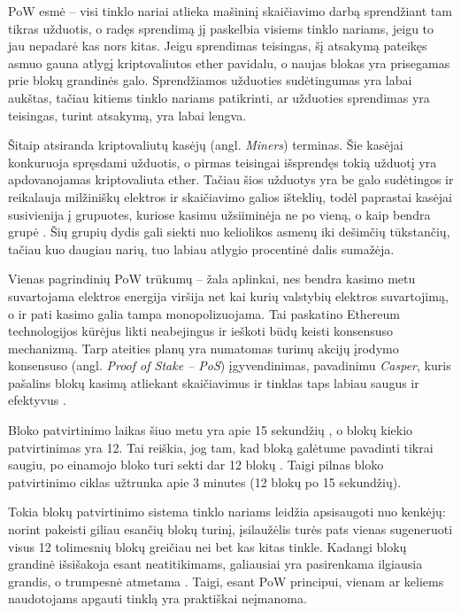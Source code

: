 \documentclass{VUMIFPSkursinis}
\begin{document}
PoW esmė – visi tinklo nariai atlieka mašininį skaičiavimo darbą sprendžiant tam tikras užduotis, o radęs sprendimą jį paskelbia visiems tinklo nariams, jeigu to jau nepadarė kas nors kitas. Jeigu sprendimas teisingas, šį atsakymą pateikęs asmuo gauna atlygį kriptovaliutos ether pavidalu, o naujas blokas yra prisegamas prie blokų grandinės galo. Sprendžiamos užduoties sudėtingumas yra labai aukštas, tačiau kitiems tinklo nariams patikrinti, ar užduoties sprendimas yra teisingas, turint atsakymą, yra labai lengva.

Šitaip atsiranda kriptovaliutų kasėjų (angl. \textit{Miners}) terminas. Šie kasėjai konkuruoja spręsdami užduotis, o pirmas teisingai išsprendęs tokią užduotį yra apdovanojamas kriptovaliuta ether. Tačiau šios užduotys yra be galo sudėtingos ir reikalauja milžiniškų elektros ir skaičiavimo galios išteklių, todėl paprastai kasėjai susivienija į grupuotes, kuriose kasimu užsiiminėja ne po vieną, o kaip bendra grupė \cite{bano2017consensus}. Šių grupių dydis gali siekti nuo keliolikos asmenų iki dešimčių tūkstančių, tačiau kuo daugiau narių, tuo labiau atlygio procentinė dalis sumažėja. 

Vienas pagrindinių PoW trūkumų – žala aplinkai, nes bendra kasimo metu suvartojama elektros energija viršija net kai kurių valstybių elektros suvartojimą, o ir pati kasimo galia tampa monopolizuojama. Tai paskatino Ethereum technologijos kūrėjus likti neabejingus ir ieškoti būdų keisti konsensuso mechanizmą. Tarp ateities planų yra numatomas turimų akcijų įrodymo konsensuso (angl. \textit{Proof of Stake – PoS}) įgyvendinimas, pavadinimu \textit{Casper}, kuris pašalins blokų kasimą atliekant skaičiavimus ir tinklas taps labiau saugus ir efektyvus \cite{buterin2017casper}.

Bloko patvirtinimo laikas šiuo metu yra apie 15 sekundžių \cite{park2017block}, o blokų kiekio patvirtinimas yra 12. Tai reiškia, jog tam, kad bloką galėtume pavadinti tikrai saugiu, po einamojo bloko turi sekti dar 12 blokų \cite{ekparinya2018double}. Taigi pilnas bloko patvirtinimo ciklas užtrunka apie 3 minutes (12 blokų po 15 sekundžių). 

Tokia blokų patvirtinimo sistema tinklo nariams leidžia apsisaugoti nuo kenkėjų: norint pakeisti giliau esančių blokų turinį, įsilaužėlis turės pats vienas sugeneruoti visus 12 tolimesnių blokų greičiau nei bet kas kitas tinkle. Kadangi blokų grandinė išsišakoja esant neatitikimams, galiausiai yra pasirenkama ilgiausia grandis, o trumpesnė atmetama \cite{bano2017consensus}. Taigi, esant PoW principui, vienam ar keliems naudotojams apgauti tinklą yra praktiškai neįmanoma.
\end{document}
